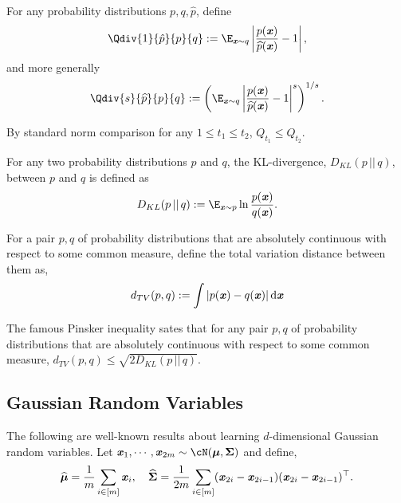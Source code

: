 

\begin{definition}\label{def:Q}
For any probability distributions $p,q,\widehat{p}$, define 
\begin{equation*}
    \Qdiv{1}{\hat{p}}{p}{q} := \E_{\xx\sim q} \left|\frac{p(\xx)}{\widehat{p}(\xx)} - 1 \right|,
\end{equation*}
and more generally
\begin{equation*}
    \Qdiv{s}{\widehat{p}}{p}{q} := \left(\E_{\xx\sim q} \left|\frac{p(\xx)}{\widehat{p}(\xx)} - 1\right|^s \right)^{1/s}.
\end{equation*}
\end{definition}
By standard norm comparison for any $1\leq t_1 \leq t_2$, $Q_{t_1} \leq Q_{t_2}$. 

\begin{definition}[KL Divergence]
For any two probability distributions $p$ and $q$, the KL-divergence, $D_{KL}(p \, || \, q)$, between $p$ and $q$ is defined as
\begin{equation*}
    D_{KL}(p \, || \, q) := \E_{\xx\sim p} \ln \frac{ p(\xx)}{q(\xx)}.
\end{equation*}
    
\end{definition}

\begin{definition}[TV Distance] 
For a pair $p, q$ of probability distributions that are absolutely continuous with respect to some common measure, define the total variation distance between them as,
\[
d_{TV}(p, q) := \int |p(\boldsymbol{\mathit{x}}) - q(\boldsymbol{\mathit{x}})|\, \mathrm{d}\boldsymbol{\mathit{x}}
\]
    
\end{definition}

\begin{theorem}
\label{thm:pinsker}
    The famous Pinsker inequality sates that for any pair $p, q$ of probability distributions that are absolutely continuous with respect to some common measure, $d_{TV}(p, q) \leq \sqrt{2 D_{KL}(p\, || \, q)}$.
\end{theorem}

\subsection*{Gaussian Random Variables}
The following are well-known results about learning $d$-dimensional Gaussian random variables. Let $\xx_1,\cdots,\xx_{2m}\sim \cN(\boldsymbol{\mu},\boldsymbol{\Sigma})$ and define,
    \begin{equation}\label{eq:samples}
          \widehat{\boldsymbol{\mu}} = \frac{1}{m}\sum_{i\in[m]}\boldsymbol{\mathit{x}}_i, \quad \widehat{\boldsymbol{\Sigma}} = \frac{1}{2m}\sum_{i\in [m]}(\boldsymbol{\mathit{x}}_{2i}-\boldsymbol{\mathit{x}}_{2i-1})(\boldsymbol{\mathit{x}}_{2i}-\boldsymbol{\mathit{x}}_{2i-1})^{\top}.
    \end{equation}
  

